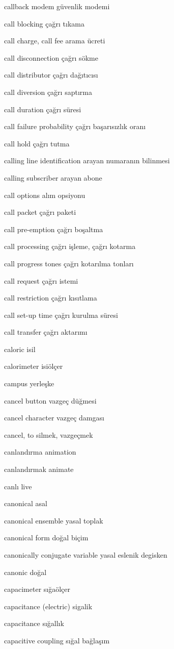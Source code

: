 \documentclass[12pt,fleqn]{article}\usepackage{../../common}
\begin{document}
callback modem güvenlik modemi

call blocking çağrı tıkama

call charge, call fee arama ücreti

call disconnection çağrı sökme

call distributor çağrı dağıtıcısı

call diversion çağrı saptırma

call duration çağrı süresi

call failure probability çağrı başarısızlık oranı

call hold çağrı tutma

calling line identification arayan numaranın bilinmesi

calling subscriber arayan abone

call options alım opsiyonu

call packet çağrı paketi

call pre-emption çağrı boşaltma

call processing çağrı işleme, çağrı kotarma

call progress tones çağrı kotarılma tonları

call request çağrı istemi

call restriction çağrı kısıtlama

call set-up time çağrı kurulma süresi

call transfer çağrı aktarımı

caloric isil

calorimeter isiölçer

campus yerleşke

cancel button vazgeç düğmesi

cancel character vazgeç damgası

cancel, to silmek, vazgeçmek

canlandırma animation

canlandırmak animate

canlı live

canonical asal

canonical ensemble yasal toplak

canonical form doğal biçim

canonically conjugate variable yasal eslenik degisken

canonic doğal

capacimeter sığaölçer

capacitance (electric) sigalik

capacitance sığallık

capacitive coupling sığal bağlaşım
\end{document}
